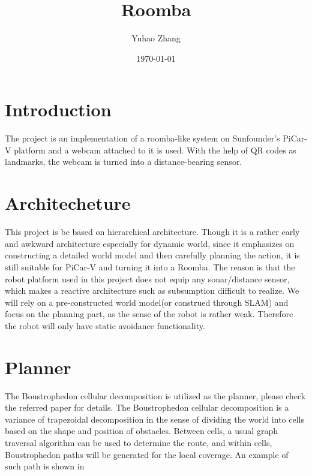 \documentclass[12pt]{article}
\title{Roomba}
\author{Yuhao Zhang}
\date{\today}
\begin{document}
\maketitle


%
\section{Introduction}
The project is an implementation of a roomba-like system on Sunfounder's PiCar-V platform and a webcam attached to it is used. With the help of QR codes as landmarks, the webcam is turned into a distance-bearing sensor.
\section{Architecheture}
\label{arch}
This project is be based on hierarchical architecture. Though it is a rather early and awkward architecture especially for dynamic world, since it emphasizes on constructing a detailed world model and then carefully planning the action, it is still suitable for PiCar-V and turning it into a Roomba. The reason is that the robot platform used in this project does not equip any sonar/distance sensor, which makes a reactive architecture such as subsumption difficult to realize. We will rely on a pre-constructed world model(or construed through SLAM) and focus on the planning part, as the sense of the robot is rather weak. Therefore the robot will only have static avoidance functionality.

\section{Planner}
\label{plan}
The Boustrophedon cellular decomposition is utilized as the planner, please check the referred paper for details. The Boustrophedon cellular decomposition is a variance of trapezoidal decomposition in the sense of dividing the world into cells based on the shape and position of obstacles. Between cells, a usual graph traversal algorithm can be used to determine the route, and within cells, Boustrophedon paths will be generated for the local coverage. An example of such path is shown in 
\end{document}
